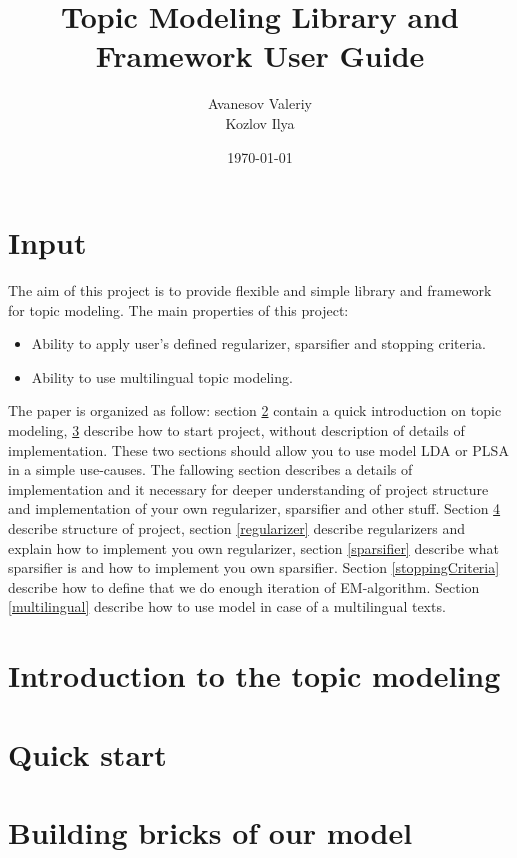 \documentclass{article}
\title{Topic Modeling Library and Framework User Guide}
\author{Avanesov Valeriy\\Kozlov Ilya}
\date{\today}
\begin{document}
\maketitle

\section{Input}
    The aim of this project is to provide flexible and simple library and framework for topic modeling.
    The main properties of this project:
    \begin{itemize}
	\item Ability to apply user's defined regularizer, sparsifier and stopping criteria.
	\item Ability to use multilingual topic modeling. 
    \end{itemize}
    The paper is organized as follow: section \ref{intro} contain a quick introduction on topic modeling,
    \ref{quickStart} describe how to start project, without description of details of implementation. These two sections should allow you
    to use model LDA or PLSA in a simple use\--causes. The fallowing section describes a details of implementation and it necessary for
    deeper understanding of project structure and implementation of your own regularizer, sparsifier and other stuff.
    Section \ref{projectStructure} describe structure of project, section \ref{regularizer} describe regularizers and explain how to implement you
    own regularizer, section \ref{sparsifier} describe what sparsifier is and how to implement you own sparsifier. Section \ref{stoppingCriteria}
    describe how to define that we do enough iteration of EM\--algorithm. Section \ref{multilingual} describe how to use model in case of a multilingual
    texts. 

\clearpage	\section{Introduction to the topic modeling}  \label{intro} 

\clearpage	\section{Quick start} \label{quickStart} 

\clearpage	\section{Building bricks of our model} \label{projectStructure} 
\end{document}
